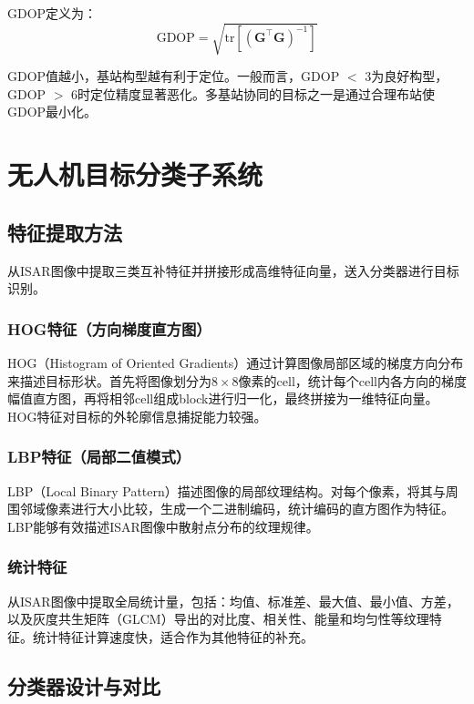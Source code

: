 \documentclass[12pt, a4paper]{article}
\begin{document}
GDOP定义为：
\begin{equation}
  \mathrm{GDOP} = \sqrt{\mathrm{tr}\!\left[\left(\bm{G}^\top\bm{G}\right)^{-1}\right]}
  \label{eq:gdop}
\end{equation}

GDOP值越小，基站构型越有利于定位。一般而言，GDOP $<$ 3为良好构型，GDOP $>$ 6时定位精度显著恶化。多基站协同的目标之一是通过合理布站使GDOP最小化。

\section{无人机目标分类子系统}

\subsection{特征提取方法}

从ISAR图像中提取三类互补特征并拼接形成高维特征向量，送入分类器进行目标识别。

\subsubsection{HOG特征（方向梯度直方图）}

HOG（Histogram of Oriented Gradients）通过计算图像局部区域的梯度方向分布来描述目标形状\cite{ref_hog}。首先将图像划分为$8\times8$像素的cell，统计每个cell内各方向的梯度幅值直方图，再将相邻cell组成block进行归一化，最终拼接为一维特征向量。HOG特征对目标的外轮廓信息捕捉能力较强。

\subsubsection{LBP特征（局部二值模式）}

LBP（Local Binary Pattern）描述图像的局部纹理结构。对每个像素，将其与周围邻域像素进行大小比较，生成一个二进制编码，统计编码的直方图作为特征。LBP能够有效描述ISAR图像中散射点分布的纹理规律。

\subsubsection{统计特征}

从ISAR图像中提取全局统计量，包括：均值、标准差、最大值、最小值、方差，以及灰度共生矩阵（GLCM）导出的对比度、相关性、能量和均匀性等纹理特征。统计特征计算速度快，适合作为其他特征的补充。

\subsection{分类器设计与对比}
\end{document}
